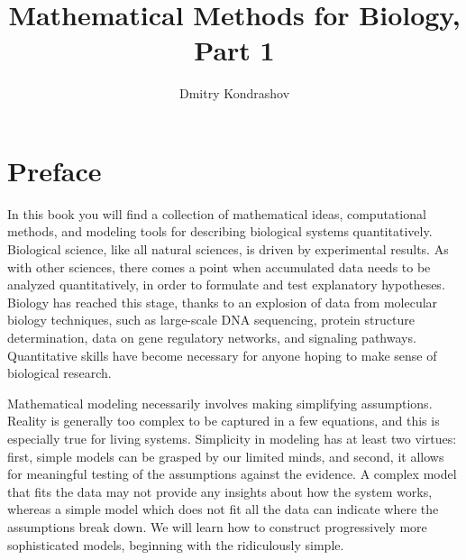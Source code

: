 \documentclass[
  letterpaper,
  DIV=11,
  numbers=noendperiod]{scrreprt}
\title{Mathematical Methods for Biology, Part 1}
\author{Dmitry Kondrashov}
\date{}
\renewcommand*\contentsname{Table of contents}
\newcommand\contentsname{Table of contents}
\begin{document}
\maketitle
\ifdefined\Shaded\renewenvironment{Shaded}{\begin{tcolorbox}[frame hidden, borderline west={3pt}{0pt}{shadecolor}, boxrule=0pt, enhanced, interior hidden, breakable, sharp corners]}{\end{tcolorbox}}\fi

\renewcommand*\contentsname{Table of contents}
{
\hypersetup{linkcolor=}
\setcounter{tocdepth}{2}
\tableofcontents
}

\hypertarget{preface}{%
\chapter*{Preface}\label{preface}}

In this book you will find a collection of mathematical ideas,
computational methods, and modeling tools for describing biological
systems quantitatively. Biological science, like all natural sciences,
is driven by experimental results. As with other sciences, there comes a
point when accumulated data needs to be analyzed quantitatively, in
order to formulate and test explanatory hypotheses. Biology has reached
this stage, thanks to an explosion of data from molecular biology
techniques, such as large-scale DNA sequencing, protein structure
determination, data on gene regulatory networks, and signaling pathways.
Quantitative skills have become necessary for anyone hoping to make
sense of biological research.

Mathematical modeling necessarily involves making simplifying
assumptions. Reality is generally too complex to be captured in a few
equations, and this is especially true for living systems. Simplicity in
modeling has at least two virtues: first, simple models can be grasped
by our limited minds, and second, it allows for meaningful testing of
the assumptions against the evidence. A complex model that fits the data
may not provide any insights about how the system works, whereas a
simple model which does not fit all the data can indicate where the
assumptions break down. We will learn how to construct progressively
more sophisticated models, beginning with the ridiculously simple.
\end{document}
